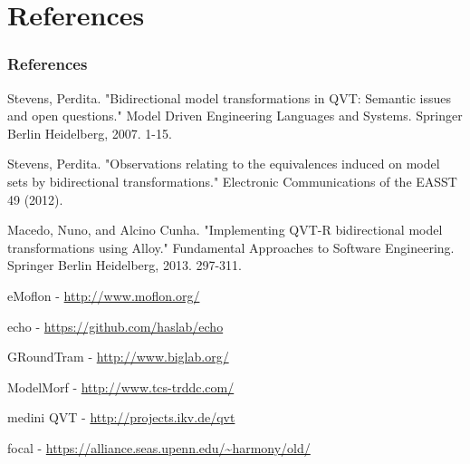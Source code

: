 \documentclass{beamer}
\begin{document}
\section{References}
\begin{frame}

\frametitle{References}


\begin{scriptsize}

\begin{thebibliography}{99} %

 Stevens, Perdita. "Bidirectional model transformations in QVT: Semantic issues and open questions." Model Driven Engineering Languages and Systems. Springer Berlin Heidelberg, 2007. 1-15.

 Stevens, Perdita. "Observations relating to the equivalences induced on model sets by bidirectional transformations." Electronic Communications of the EASST 49 (2012).

 Macedo, Nuno, and Alcino Cunha. "Implementing QVT-R bidirectional model transformations using Alloy." Fundamental Approaches to Software Engineering. Springer Berlin Heidelberg, 2013. 297-311.


 eMoflon - \url{http://www.moflon.org/}

 echo - \url{https://github.com/haslab/echo}

 GRoundTram - \url{http://www.biglab.org/}

 ModelMorf - \url{http://www.tcs-trddc.com/}

 medini QVT - \url{http://projects.ikv.de/qvt}

 focal - \url{https://alliance.seas.upenn.edu/~harmony/old/}

\end{thebibliography}
\end{scriptsize}


\end{frame}





\end{document}
